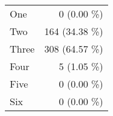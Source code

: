 \begin{tabular}{ l  r }
One & 0 (0.00 \%)\\
Two & 164 (34.38 \%)\\
Three & 308 (64.57 \%)\\
Four & 5 (1.05 \%)\\
Five & 0 (0.00 \%)\\
Six & 0 (0.00 \%)\\
\end{tabular}